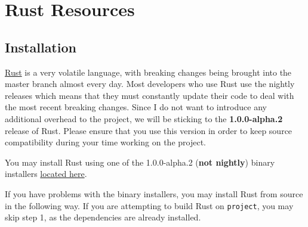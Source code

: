 \section{Rust Resources}\label{rust-resources}

\subsection{Installation}\label{installation}

\href{https://github.com/rust-lang/rust}{Rust} is a very volatile
language, with breaking changes being brought into the master branch
almost every day. Most developers who use Rust use the nightly releases
which means that they must constantly update their code to deal with the
most recent breaking changes. Since I do not want to introduce any
additional overhead to the project, we will be sticking to the
\textbf{1.0.0-alpha.2} release of Rust. Please ensure that you use this
version in order to keep source compatibility during your time working
on the project.

You may install Rust using one of the 1.0.0-alpha.2 (\textbf{not
nightly}) binary installers
\href{http://www.rust-lang.org/install.html}{located here}.

If you have problems with the binary installers, you may install Rust
from source in the following way. If you are attempting to build Rust on
\lstinline!project!, you may skip step 1, as the dependencies are
already installed.

